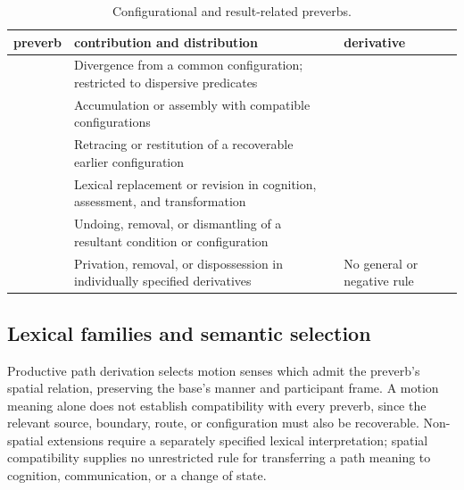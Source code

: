 \begin{table}[htbp]
  \footnotesize
  \caption{Configurational and result-related preverbs.}\label{tab:preverbs-configuration-result}
  \begin{tabularx}{\textwidth}{l L L}
    \toprule
    {\sc preverb} & {\sc contribution and distribution} & {\sc derivative} \\
    \midrule
     & Divergence from a common configuration; restricted to dispersive predicates
      &   \\
     & Accumulation or assembly with compatible configurations
      &   \\
     & Retracing or restitution of a recoverable earlier configuration
      &   \\
     & Lexical replacement or revision in cognition, assessment, and transformation
      &   \\
     & Undoing, removal, or dismantling of a resultant condition or configuration
      &   \\
     & Privation, removal, or dispossession in individually specified derivatives
      & No general  or negative rule \\
    \bottomrule
  \end{tabularx}
\end{table}

\subsection{Lexical families and semantic selection}

Productive path derivation selects motion senses which admit the preverb's
spatial relation, preserving the base's manner and participant frame. A motion
meaning alone does not establish compatibility with every preverb, since the
relevant source, boundary, route, or configuration must also be recoverable.
Non-spatial extensions require a separately specified lexical interpretation;
spatial compatibility supplies no unrestricted rule for transferring a path
meaning to cognition, communication, or a change of state.

